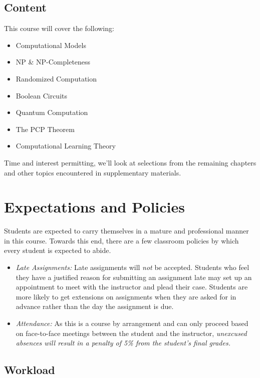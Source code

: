 \documentclass[nobib]{tufte-handout}
\begin{document}
\subsection{Content}

This course will cover the following:
\begin{itemize}
  \item Computational Models
  \item NP \& NP-Completeness
  \item Randomized Computation
  \item Boolean Circuits
  \item Quantum Computation
  \item The PCP Theorem
  \item Computational Learning Theory
\end{itemize}
Time and interest permitting, we'll look at selections from the remaining chapters and other topics encountered in supplementary materials.

\section{Expectations and Policies}

Students are expected to carry themselves in a mature and professional manner in this course. Towards this end, there are a few classroom policies by which every student  is expected to abide.
\begin{itemize}

\item \textit{Late Assignments: } Late assignments will \textit{not} be accepted.  Students who feel they have a justified reason for submitting an assignment late may set up an appointment to meet with the instructor and plead their case.  Students are more likely to get extensions on assignments when they are asked for in advance rather than the day the assignment is due.

\item \textit{Attendance: } As this is a course by arrangement and can only proceed based on face-to-face meetings between the student and the instructor, \textit{unexcused absences will result in a penalty of 5\% from the student's final grades.}

\end{itemize}

\subsection{Workload}
\end{document}
